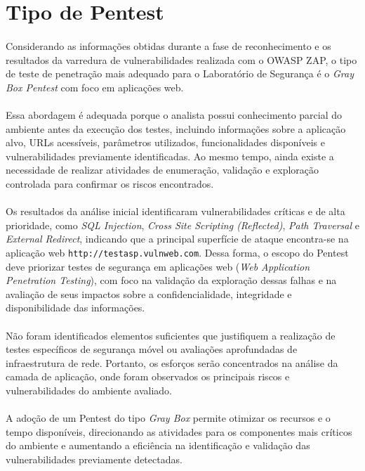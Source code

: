 \section{Tipo de Pentest}

\paragraph{}
Considerando as informações obtidas durante a fase de reconhecimento e os
resultados da varredura de vulnerabilidades realizada com o OWASP ZAP, o tipo
de teste de penetração mais adequado para o Laboratório de Segurança é o
\textit{Gray Box Pentest} com foco em aplicações web.

\paragraph{}
Essa abordagem é adequada porque o analista possui conhecimento parcial do
ambiente antes da execução dos testes, incluindo informações sobre a aplicação
alvo, URLs acessíveis, parâmetros utilizados, funcionalidades disponíveis e
vulnerabilidades previamente identificadas. Ao mesmo tempo, ainda existe a
necessidade de realizar atividades de enumeração, validação e exploração
controlada para confirmar os riscos encontrados.

\paragraph{}
Os resultados da análise inicial identificaram vulnerabilidades críticas e de
alta prioridade, como \textit{SQL Injection}, \textit{Cross Site Scripting
(Reflected)}, \textit{Path Traversal} e \textit{External Redirect}, indicando
que a principal superfície de ataque encontra-se na aplicação web
\texttt{http://testasp.vulnweb.com}. Dessa forma, o escopo do Pentest deve
priorizar testes de segurança em aplicações web (\textit{Web Application
Penetration Testing}), com foco na validação da exploração dessas falhas e na
avaliação de seus impactos sobre a confidencialidade, integridade e
disponibilidade das informações.

\paragraph{}
Não foram identificados elementos suficientes que justifiquem a realização de
testes específicos de segurança móvel ou avaliações aprofundadas de
infraestrutura de rede. Portanto, os esforços serão concentrados na análise da
camada de aplicação, onde foram observados os principais riscos e
vulnerabilidades do ambiente avaliado.

\paragraph{}
A adoção de um Pentest do tipo \textit{Gray Box} permite otimizar os recursos e
o tempo disponíveis, direcionando as atividades para os componentes mais
críticos do ambiente e aumentando a eficiência na identificação e validação das
vulnerabilidades previamente detectadas.
